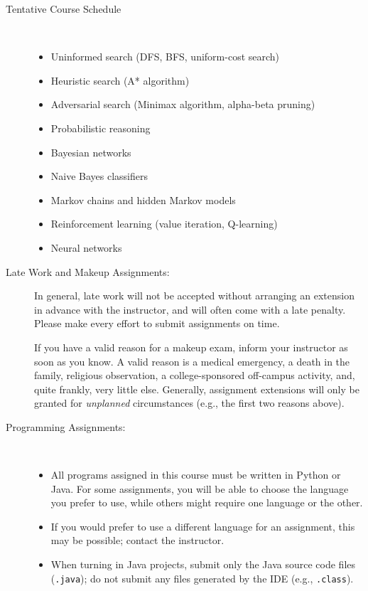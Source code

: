 \documentclass [letterpaper,11pt]{article}
\begin{document}
\begin{description}
\item[Tentative Course Schedule]\

\begin{itemize} 
	\item Uninformed search (DFS, BFS, uniform-cost search)
	\item Heuristic search (A* algorithm)
	\item Adversarial search (Minimax algorithm, alpha-beta pruning)
	\item Probabilistic reasoning
	\item Bayesian networks
	\item Naive Bayes classifiers
	\item Markov chains and hidden Markov models
	\item Reinforcement learning (value iteration, Q-learning)
	\item Neural networks
\end{itemize}

\item[Late Work and Makeup Assignments:]
In general, late work will not be accepted without arranging an extension in advance
with the instructor, and will often come with a late penalty.
Please make every effort to submit assignments on time.

If you have a valid reason for a makeup exam, inform your instructor
   as soon as you know.  A valid reason is a medical emergency, a death in the family, 
   religious observation, a college-sponsored off-campus activity, and, quite frankly, 
   very little else.  Generally, assignment extensions will only be granted for 
   \emph{unplanned} circumstances (e.g., the first two reasons above). 
   
\item[Programming Assignments:]\

\begin{itemize}\setlength{\itemsep}{0em}\setlength{\parskip}{0pt}
        \item All programs assigned in this course must be written in Python or Java.
        For some assignments, you will be able to choose the language you prefer to use, 
        while others might require one language or the other.
        
        \item If you would prefer to use a different language for an assignment, this may
        be possible; contact the instructor.
        
        \item   When turning in Java projects,
        submit only the Java source code files (\texttt{.java}); do not submit any files generated by the IDE (e.g., \texttt{.class}).  
                        

\end{itemize}
\end{description}
\end{document}
